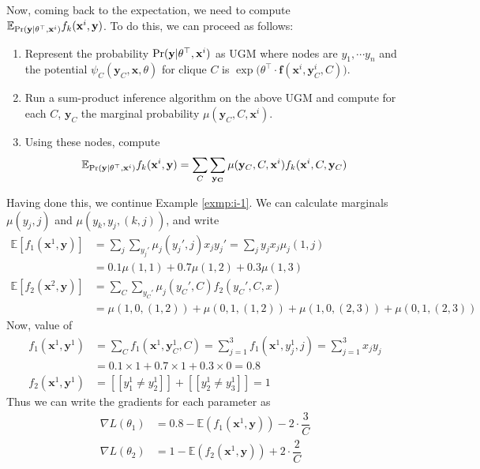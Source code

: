 Now, coming back to the expectation, we need to compute \\ $\mathbb{E}_{\text{Pr}(\mathbf y|\theta^\top, \mathbf x^i)}f_k(\mathbf x^i, \mathbf y)$. To do this, we can proceed as follows:
\begin{enumerate}
	\item Represent the probability $\text{Pr}(\mathbf y|\theta^\top, \mathbf x^i)$ as UGM where nodes are $y_1, \cdots y_n$ and the potential $\psi_C(\mathbf y_C, \mathbf x, \theta)$ for clique $C$ is $\exp\big(\theta^\top \cdot \mathbf f(\mathbf x^i, \mathbf y_C^i, C)\big)$.
	\item Run a sum-product inference algorithm on the above UGM and compute for each $C$, $\mathbf y_C$ the marginal probability $\mu(\mathbf y_C, C, \mathbf x^i)$.
	\item Using these nodes, compute 
	\[\mathbb{E}_{\text{Pr}(\mathbf y|\theta^\top, \mathbf x^i)}f_k(\mathbf x^i, \mathbf y) = \sum_C\sum_\mathbf{y_C} \mu(\mathbf y_C, C, \mathbf x^i)f_k(\mathbf x^i, C, \mathbf y_C)\]
\end{enumerate}
Having done this, we continue Example \ref{exmp:i-1}. We can calculate marginals $\mu(y_j, j)$ and $\mu(y_k, y_j, (k,j))$, and write
\begin{align*}
\mathbb{E}[f_1(\mathbf x^1, \mathbf y)] &= \sum_j \sum_{y_j'} \mu_j(y_j', j)x_jy_j' =\sum_j y_jx_j \mu_j(1,j) \\&= 0.1\mu(1,1) + 0.7 \mu(1,2) + 0.3\mu(1,3) \\
\mathbb{E}[f_2(\mathbf x^2, \mathbf y)] &= \sum_C \sum_{y_C'} \mu_j(y_C', C)f_2(y_C', C, x)\\&= \mu(1,0,(1,2)) + \mu(0,1, (1,2)) + \mu(1,0,(2,3)) + \mu(0,1, (2,3))
\end{align*}
Now, value of 
\begin{align*}
f_1(\mathbf x^1, \mathbf y^1) &= \sum_C f_1(\mathbf x^1, \mathbf y^1_C, C) = \sum_{j=1}^3 f_1(\mathbf x^1, y^1_j, j) = \sum_{j=1}^3 x_jy_j\\
&= 0.1 \times 1 + 0.7 \times 1 + 0.3 \times 0 = 0.8 \\
f_2(\mathbf x^1, \mathbf y^1) &= [\![y_1^1 \neq y_2^1]\!] + [\![y_2^1 \neq y_3^1]\!] = 1
\end{align*}
Thus we can write the gradients for each parameter as
\begin{align*}
\nabla L(\theta_1) &= 0.8 - \mathbb{E}(f_1(\mathbf x^1, \mathbf y)) - 2\cdot\dfrac{3}{C} \\
\nabla L(\theta_2)&=  1 - \mathbb{E}(f_2(\mathbf x^1, \mathbf y)) + 2\cdot\dfrac{2}{C} 
\end{align*}
